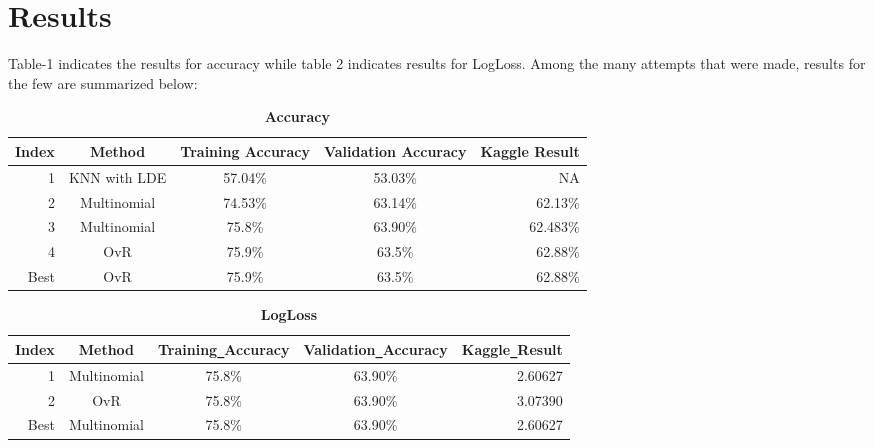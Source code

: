 \documentclass[journal]{IEEEtran}
\begin{document}
\section{Results}
Table-1 indicates the results for accuracy while table 2 indicates results for LogLoss. Among the many attempts that were made, results for the few are summarized below: \par
\begin{table}[!htb]
	\captionsetup{size=footnotesize}
	\caption{\textbf{Accuracy}} \label{tab:fr1}
	\setlength\tabcolsep{0pt} %
	\footnotesize\centering
	
	\smallskip 
	\begin{tabular*}{\columnwidth}{@{\extracolsep{\fill}}rcccr}
		\toprule
		Index & Method & Training Accuracy & Validation Accuracy & Kaggle Result \\
		\midrule
		1   & KNN with LDE   & 57.04\%    & 53.03\%     & NA \\
		2   & Multinomial   & 74.53\%    & 63.14\%     & 62.13\% \\
		3   & Multinomial   & 75.8\%     & 63.90\%     & 62.483\% \\
		4   & OvR   & 75.9\%     & 63.5\%     & 62.88\% \\
		\midrule
		Best & OvR & 75.9\%     & 63.5\%     & 62.88\% \\
		\bottomrule
	\end{tabular*}
\end{table}

\begin{table}[!htb]
	\captionsetup{size=footnotesize}
	\caption{\textbf{LogLoss}} \label{tab:fr2}
	\setlength\tabcolsep{0pt} %
	\footnotesize\centering
	
	\smallskip 
	\begin{tabular*}{\columnwidth}{@{\extracolsep{\fill}}rcccr}
		\toprule
		Index  & Method & Training\verb!_!Accuracy & Validation\verb!_!Accuracy & Kaggle\verb!_!Result \\
		\midrule
		1   & Multinomial   & 75.8\%    & 63.90\%   & 2.60627 \\
		2   & OvR   & 75.8\%     & 63.90\%     & 3.07390 \\
		\midrule
		Best   & Multinomial   & 75.8\%    & 63.90\%   & 2.60627 \\
		\bottomrule
	\end{tabular*}
\end{table}
\end{document}
